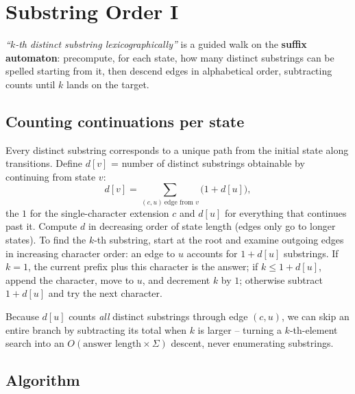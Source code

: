 \section{Substring Order I}
\label{sec:cses-substring-order-i}


\begin{patternbox}
\emph{``$k$-th distinct substring lexicographically''} is a guided walk on
the \textbf{suffix automaton}: precompute, for each state, how many
distinct substrings can be spelled starting from it, then descend edges in
alphabetical order, subtracting counts until $k$ lands on the target.
\end{patternbox}

\subsection*{Counting continuations per state}

Every distinct substring corresponds to a unique path from the initial
state along transitions. Define $d[v]$ = number of distinct substrings
obtainable by continuing from state $v$:
\[
  d[v]=\sum_{(c,u)\ \text{edge from }v}\big(1+d[u]\big),
\]
the $1$ for the single-character extension $c$ and $d[u]$ for everything
that continues past it. Compute $d$ in decreasing order of state length
(edges only go to longer states). To find the $k$-th substring, start at
the root and examine outgoing edges in increasing character order: an edge
to $u$ accounts for $1+d[u]$ substrings. If $k=1$, the current prefix plus
this character is the answer; if $k\le1+d[u]$, append the character, move
to $u$, and decrement $k$ by $1$; otherwise subtract $1+d[u]$ and try the
next character.

\begin{ideabox}
Because $d[u]$ counts \emph{all} distinct substrings through edge $(c,u)$,
we can skip an entire branch by subtracting its total when $k$ is larger --
turning a $k$-th-element search into an $O(\text{answer length}\times
\Sigma)$ descent, never enumerating substrings.
\end{ideabox}

\subsection*{Algorithm}

